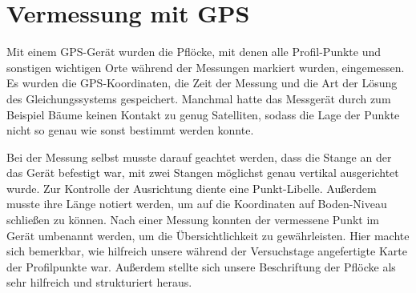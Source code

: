 \section{Vermessung mit GPS}

Mit einem GPS-Gerät wurden die Pflöcke, mit denen alle Profil-Punkte und sonstigen wichtigen Orte während der Messungen markiert wurden, eingemessen. Es wurden die GPS-Koordinaten, die Zeit der Messung und die Art der Lösung des Gleichungssystems gespeichert. Manchmal hatte das Messgerät durch zum Beispiel Bäume keinen Kontakt zu genug Satelliten, sodass die Lage der Punkte nicht so genau wie sonst bestimmt werden konnte.

Bei der Messung selbst musste darauf geachtet werden, dass die Stange an der das Gerät befestigt war, mit zwei Stangen möglichst genau vertikal ausgerichtet wurde. Zur Kontrolle der Ausrichtung diente eine Punkt-Libelle. Außerdem musste ihre Länge notiert werden, um auf die Koordinaten auf Boden-Niveau schließen zu können. Nach einer Messung konnten der vermessene Punkt im Gerät umbenannt werden, um die Übersichtlichkeit zu gewährleisten. Hier machte sich bemerkbar, wie hilfreich unsere während der Versuchstage angefertigte Karte der Profilpunkte war. Außerdem stellte sich unsere Beschriftung der Pflöcke als sehr hilfreich und strukturiert heraus.